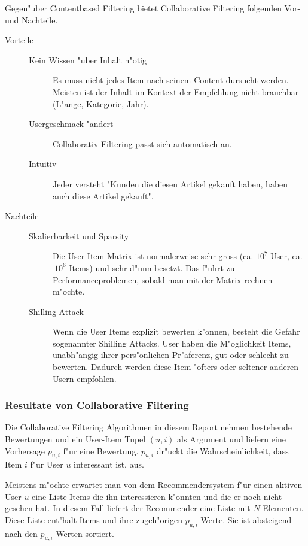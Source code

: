\documentclass[a4paper, 12pt]{article}
\begin{document}
Gegen"uber Contentbased Filtering bietet Collaborative Filtering folgenden Vor- und Nachteile.
\begin{description}
\item[Vorteile]
\begin{description}
\item[Kein Wissen "uber Inhalt n"otig] Es muss nicht jedes Item nach seinem Content dursucht werden. Meisten ist der Inhalt im Kontext der Empfehlung nicht brauchbar (L"ange, Kategorie, Jahr).
\item[Usergeschmack "andert] Collaborativ Filtering passt sich automatisch an.
\item[Intuitiv] Jeder versteht "Kunden die diesen Artikel gekauft haben, haben auch diese Artikel gekauft".
\end{description}
\item[Nachteile]
\begin{description}
\item[Skalierbarkeit und Sparsity] Die User-Item Matrix ist normalerweise sehr gross (ca. $10^{7}$ User, ca. $~10^6$ Items) und sehr d"unn besetzt. Das f"uhrt zu Performanceproblemen, sobald man mit der Matrix rechnen m"ochte.
\item[Shilling Attack] Wenn die User Items explizit bewerten k"onnen, besteht die Gefahr sogenannter Shilling Attacks. User haben die M"oglichkeit Items, unabh"angig ihrer pers"onlichen Pr"aferenz, gut oder schlecht zu bewerten. Dadurch werden diese Item "ofters oder seltener anderen Usern empfohlen.
\end{description}
\end{description}

\subsubsection{Resultate von Collaborative Filtering}
\label{sec:output}

Die Collaborative Filtering Algorithmen in diesem Report nehmen bestehende Bewertungen und ein User-Item Tupel $(u,i)$ als Argument und liefern eine Vorhersage $p_{u,i}$ f"ur eine Bewertung.  $p_{u,i}$ dr"uckt die Wahrscheinlichkeit, dass Item $i$ f"ur User $u$ interessant ist, aus. 

Meistens m"ochte erwartet man von dem Recommendersystem f"ur einen aktiven User $u$ eine Liste Items die ihn interessieren k"onnten und die er noch nicht gesehen hat. In diesem Fall liefert der Recommender eine Liste mit $N$ Elementen. Diese Liste ent"halt Items und ihre zugeh"origen $p_{u,i}$ Werte. Sie ist absteigend nach den $p_{u,i}$-Werten sortiert. 
\end{document}

